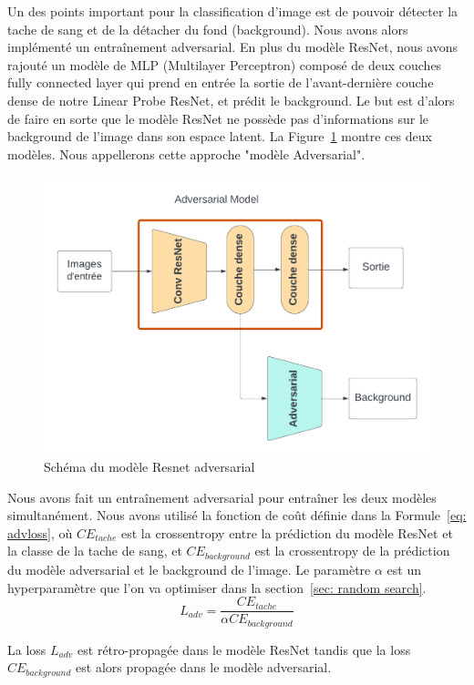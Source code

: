 \documentclass[a4paper]{article}
\begin{document}
Un des points important pour la classification d'image est de pouvoir détecter la tache de sang et de la détacher du fond (background). Nous avons alors implémenté un entraînement adversarial. En plus du modèle ResNet, nous avons rajouté un modèle de MLP (Multilayer Perceptron) composé de deux couches fully connected layer qui prend en entrée la sortie de l'avant-dernière couche dense de notre Linear Probe ResNet, et prédit le background. Le but est d'alors de faire en sorte que le modèle ResNet ne possède pas d'informations sur le background de l'image dans son espace latent. La Figure~\ref{fig:resnet_adv} montre ces deux modèles. Nous appellerons cette approche "modèle Adversarial".

\begin{figure}[ht]
    \centering
    \includegraphics[width=0.7\linewidth]{../asset/Resnet_adv.png}
    \caption{Schéma du modèle Resnet adversarial}
    \label{fig:resnet_adv}
\end{figure}

Nous avons fait un entraînement adversarial pour entraîner les deux modèles simultanément. Nous avons utilisé la fonction de coût définie dans la Formule~\ref{eq: advloss}, où $CE_{tache}$ est la crossentropy entre la prédiction du modèle ResNet et la classe de la tache de sang, et $CE_{background}$ est la crossentropy de la prédiction du modèle adversarial et le background de l'image. Le paramètre $\alpha$ est un hyperparamètre que l'on va optimiser dans la section~\ref{sec: random search}.
\begin{equation}
    L_{adv} = \frac{CE_{tache}}{\alpha CE_{background}}
    \label{eq: advloss}
\end{equation}

La loss $L_{adv}$ est rétro-propagée dans le modèle ResNet tandis que la loss $CE_{background}$ est alors propagée dans le modèle adversarial.
\end{document}
